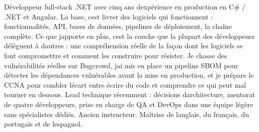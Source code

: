 \documentclass[]{resume-format}
\begin{document}
%


\setlength\fboxsep{10pt}%

\begingroup

\noindent
{}
\endgroup
\vspace{0mm} %



\begin{cvpersonalstatement}
  \item { Développeur full-stack .NET avec cinq ans d\textquotesingle{}expérience en production en C\# / .NET
et Angular. La base, c\textquotesingle{}est livrer des logiciels qui fonctionnent : fonctionnalités,
API, bases de données, pipelines de déploiement, la chaîne complète. Ce que j\textquotesingle{}apporte
en plus, c\textquotesingle{}est la couche que la plupart des développeurs délèguent à d\textquotesingle{}autres : une
compréhension réelle de la façon dont les logiciels se font compromettre et comment
les construire pour résister. Je chasse des vulnérabilités réelles sur Bugcrowd, j\textquotesingle{}ai
mis en place un pipeline SBOM pour détecter les dépendances vulnérables avant la mise
en production, et je prépare le CCNA pour combler l\textquotesingle{}écart entre écrire du
code et comprendre ce qui peut mal tourner en dessous. Lead technique récemment :
décisions d\textquotesingle{}architecture, mentorat de quatre développeurs, prise en charge de QA et
DevOps dans une équipe légère sans spécialistes dédiés. Ancien instructeur. Maîtrise
de l\textquotesingle{}anglais, du français, du portugais et de l\textquotesingle{}espagnol.
 }
\end{cvpersonalstatement}
\end{document}
